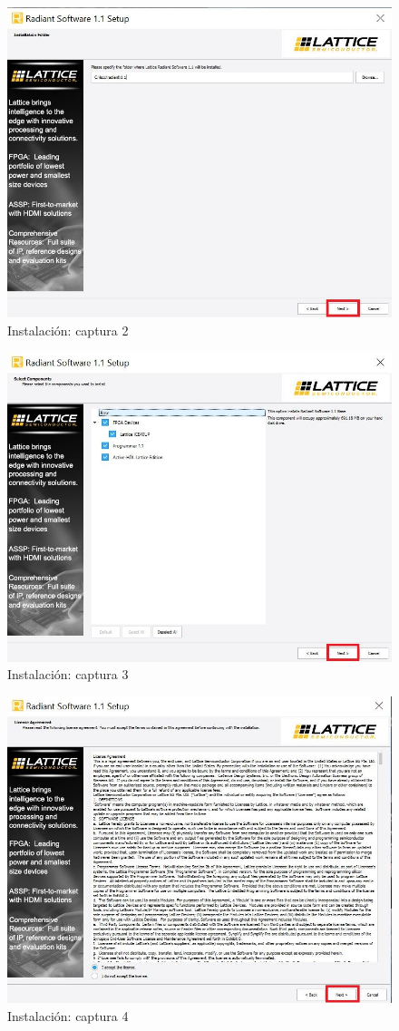 \documentclass{article}
\begin{document}
\begin{figure}[H]
\centering
\includegraphics[width=0.8\linewidth]{images/inst2.JPG}
\caption{Instalación: captura 2 }
\label{fig:install}
\end{figure}

\begin{figure}[H]
\centering
\includegraphics[width=0.8\linewidth]{images/inst3.JPG}
\caption{Instalación: captura 3 }
\label{fig:install}
\end{figure}

\begin{figure}[H]
\centering
\includegraphics[width=0.8\linewidth]{images/inst4.JPG}
\caption{Instalación: captura 4 }
\label{fig:install}
\end{figure}
\end{document}
